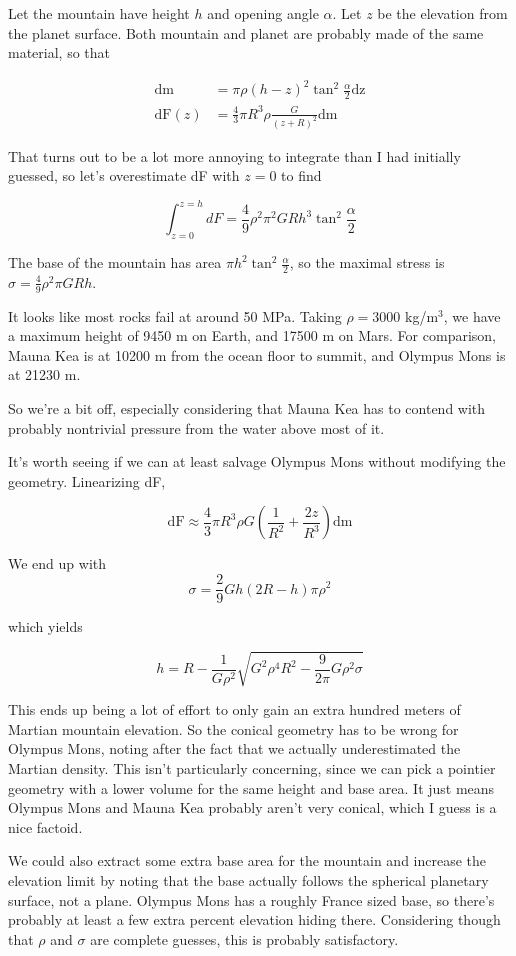 \documentclass[12pt]{article}
\begin{document}
Let the mountain have height \(h\) and opening angle \(\alpha\). Let \(z\) be the elevation from the planet surface. Both mountain and planet are probably made of the same material, so that

\begin{align*}
\mathrm{dm} &= \pi\rho(h-z)^2\tan^2\frac{\alpha}{2}\mathrm{dz}\\
\mathrm{dF}(z) &= \frac{4}{3}\pi R^3 \rho \frac{G}{(z+R)^2}\mathrm{dm}
\end{align*}

That turns out to be a lot more annoying to integrate than I had initially guessed, so let's overestimate dF with \(z=0\) to find

\[ \int_{z=0}^{z=h}dF = \frac{4}{9}\rho^2\pi^2 G R h^3 \tan^2\frac{\alpha}{2}
\]

The base of the mountain has area \(\pi h^2\tan^2\frac{\alpha}{2}\), so the maximal stress is \(\sigma = \frac{4}{9}\rho^2\pi G R h\).

It looks like most rocks fail at around 50 MPa. Taking \(\rho = 3000 \) kg/m\(^3\), we have a maximum height of 9450 m on Earth, and 17500 m on Mars. For comparison, Mauna Kea is at 10200 m from the ocean floor to summit, and Olympus Mons is at 21230 m.

So we're a bit off, especially considering that Mauna Kea has to contend with probably nontrivial pressure from the water above most of it.

It's worth seeing if we can at least salvage Olympus Mons without modifying the geometry. Linearizing dF,

\[\mathrm{dF} \approx \frac{4}{3}\pi R^3 \rho G \left(\frac{1}{R^2}+\frac{2z}{R^3}\right)\mathrm{dm}
\]

We end up with
\[ \sigma = \frac{2}{9}Gh(2R-h)\pi \rho^2
\]

which yields

\[ h= R-\frac{1}{G\rho^2}\sqrt{G^2\rho^4 R^2 -\frac{9}{2\pi}G\rho^2\sigma}
\]

This ends up being a lot of effort to only gain an extra hundred meters of Martian mountain elevation. So the conical geometry has to be wrong for Olympus Mons, noting after the fact that we actually underestimated the Martian density. This isn't particularly concerning, since we can pick a pointier geometry with a lower volume for the same height and base area. It just means Olympus Mons and Mauna Kea probably aren't very conical, which I guess is a nice factoid.

We could also extract some extra base area for the mountain and increase the elevation limit by noting that the base actually follows the spherical planetary surface, not a plane. Olympus Mons has a roughly France sized base, so there's probably at least a few extra percent elevation hiding there. Considering though that \(\rho\) and \(\sigma\) are complete guesses, this is probably satisfactory.
\end{document}
